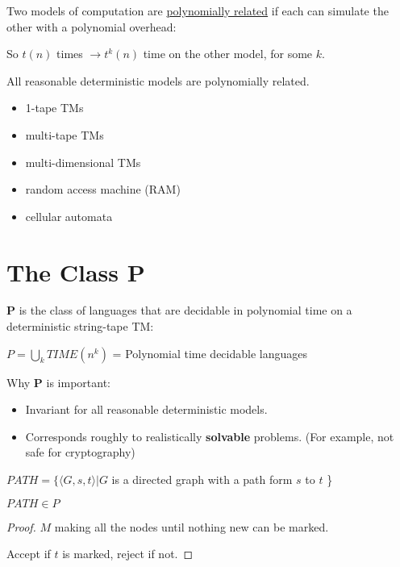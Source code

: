 \begin{definition}
    Two models of computation are \underline{polynomially related} if each can simulate the other with a polynomial overhead:

    So \(t(n)\) times \(\rightarrow t^k(n)\) time on the other model, for some \(k\).   
\end{definition}

All reasonable deterministic models are polynomially related.

\begin{itemize}
    \item 1-tape TMs
    \item multi-tape TMs
    \item multi-dimensional TMs
    \item random access machine (RAM)
    \item cellular automata
\end{itemize}

\section{The Class P}

\begin{definition}[Defnition of P]
    \textbf{P} is the class of languages that are decidable in polynomial time on a deterministic string-tape TM:

    \(P = \bigcup_{k} TIME(n^k)\) = Polynomial time decidable languages
\end{definition}

Why \textbf{P} is important: 
\begin{itemize}
    \item Invariant for all reasonable deterministic models.
    \item Corresponds roughly to realistically \textbf{solvable} problems. (For example, not safe for cryptography)
\end{itemize}

\begin{example}
    \(PATH = \{ \langle G, s, t \rangle | G \) is a directed graph with a path form \(s\) to \(t\)  \}

    \begin{theorem}
        \(PATH \in P\) 
    \end{theorem}
    \begin{proof}
        \(M\) making all the nodes until nothing new can be marked. 

        Accept if \(t\) is marked, reject if not. 
    \end{proof}
\end{example}

